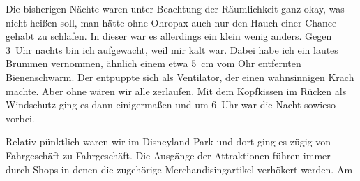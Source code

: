 Die bisherigen Nächte waren unter Beachtung der Räumlichkeit ganz okay, was nicht heißen soll, man hätte ohne Ohropax auch nur den Hauch einer Chance gehabt zu schlafen.
In dieser war es allerdings ein klein wenig anders.
Gegen 3~Uhr nachts bin ich aufgewacht, weil mir kalt war.
Dabei habe ich ein lautes Brummen vernommen, ähnlich einem etwa 5~cm vom Ohr entfernten Bienenschwarm.
Der entpuppte sich als Ventilator, der einen wahnsinnigen Krach machte.
Aber ohne wären wir alle zerlaufen.
Mit dem Kopfkissen im Rücken als Windschutz ging es dann einigermaßen und um 6~Uhr war die Nacht sowieso vorbei.

Relativ pünktlich waren wir im Disneyland Park und dort ging es zügig von Fahrgeschäft zu Fahrgeschäft.
Die Ausgänge der Attraktionen führen immer durch Shops in denen die zugehörige Merchandisingartikel verhökert werden.
Am 


\vspace*{.3\paperheight}

